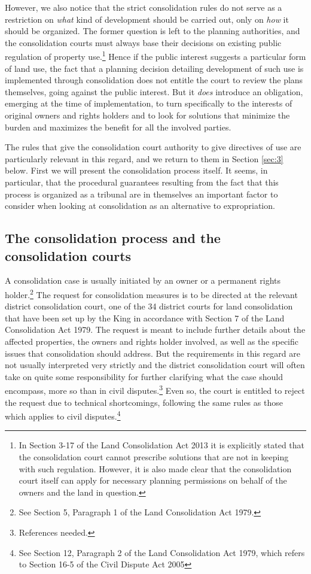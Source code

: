 However, we also notice that the strict consolidation rules do not serve as a restriction on \emph{what} kind of development should be carried out, only on \emph{how} it should be organized. The former question is left to the planning authorities, and the consolidation courts must always base their decisions on existing public regulation of property use.\footnote{In Section 3-17 of the Land Consolidation Act 2013 it is explicitly stated that the consolidation court cannot prescribe solutions that are not in keeping with such regulation. However, it is also made clear that the consolidation court itself can apply for necessary planning permissions on behalf of the owners and the land in question.} Hence if the public interest suggests a particular form of land use, the fact that a planning decision detailing development of such use is implemented through consolidation does not entitle the court to review the plans themselves, going against the public interest. But it \emph{does} introduce an obligation, emerging at the time of implementation, to turn specifically to the interests of original owners and rights holders and to look for solutions that minimize the burden and maximizes the benefit for all the involved parties.

The rules that give the consolidation court authority to give directives of use are particularly relevant in this regard, and we return to them in Section \ref{sec:3} below. First we will present the consolidation process itself. It seems, in particular, that the procedural guarantees resulting from the fact that this process is organized as a tribunal are in themselves an important factor to consider when looking at consolidation as an alternative to expropriation.

\subsection{The consolidation process and the consolidation courts}\label{subsec:21}

A consolidation case is usually initiated by an owner or a permanent rights holder.\footnote{See Section 5, Paragraph 1 of the Land Consolidation Act 1979.} The request for consolidation measures is to be directed at the relevant district consolidation court, one of the 34 district courts for land consolidation that have been set up by the King in accordance with Section 7 of the Land Consolidation Act 1979. The request is meant to include further details about the affected properties, the owners and rights holder involved, as well as the specific issues that consolidation should address. But the requirements in this regard are not usually interpreted very strictly and the district consolidation court will often take on quite some responsibility for further clarifying what the case should encompass, more so than in civil disputes.\footnote{References needed.} Even so, the court is entitled to reject the request due to technical shortcomings, following the same rules as those which applies to civil disputes.\footnote{See Section 12, Paragraph 2 of the Land Consolidation Act 1979, which refers to Section 16-5 of the Civil Dispute Act 2005}


